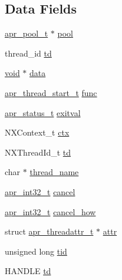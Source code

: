 \subsection*{Data Fields}
\begin{DoxyCompactItemize}
\item 
\hyperlink{structapr__pool__t}{apr\+\_\+pool\+\_\+t} $\ast$ \hyperlink{structapr__thread__t_acc06612e8a6404c0d47559be4c8e918d}{pool}
\item 
thread\+\_\+id \hyperlink{structapr__thread__t_aae7a4bb7692d30e3e4899581a5e87ff0}{td}
\item 
\hyperlink{group__MOD__ISAPI_gacd6cdbf73df3d9eed42fa493d9b621a6}{void} $\ast$ \hyperlink{structapr__thread__t_ab342d8382d9c80234fa19c632230df4f}{data}
\item 
\hyperlink{group__apr__thread__proc_gaa1f88d2a6fe971ac200e466cae5f63e0}{apr\+\_\+thread\+\_\+start\+\_\+t} \hyperlink{structapr__thread__t_ae5f93ab30b3a20eebd707e9a41d9fa98}{func}
\item 
\hyperlink{group__apr__errno_gaa5105fa83cc322f09382292db8b47593}{apr\+\_\+status\+\_\+t} \hyperlink{structapr__thread__t_a9ec6098badd8bf08b1c8fc7fb3747e44}{exitval}
\item 
N\+X\+Context\+\_\+t \hyperlink{structapr__thread__t_a34de6673457138356c44fbd3dc662904}{ctx}
\item 
N\+X\+Thread\+Id\+\_\+t \hyperlink{structapr__thread__t_a1c1cf1146c92060226a73836f65cba0b}{td}
\item 
char $\ast$ \hyperlink{structapr__thread__t_ad255d124aaee44436af04501e5196520}{thread\+\_\+name}
\item 
\hyperlink{group__apr__platform_ga21ef1e35fd3ff9be386f3cb20164ff02}{apr\+\_\+int32\+\_\+t} \hyperlink{structapr__thread__t_a77d772ca0c18485107e7a5c2b778c30f}{cancel}
\item 
\hyperlink{group__apr__platform_ga21ef1e35fd3ff9be386f3cb20164ff02}{apr\+\_\+int32\+\_\+t} \hyperlink{structapr__thread__t_a6244b09e234f465572d41e7c456f90fe}{cancel\+\_\+how}
\item 
struct \hyperlink{structapr__threadattr__t}{apr\+\_\+threadattr\+\_\+t} $\ast$ \hyperlink{structapr__thread__t_ab941acbf2b6ded301d0a1d5dbc311870}{attr}
\item 
unsigned long \hyperlink{structapr__thread__t_aa5d9bab844e08c0cc551f31492b3ab97}{tid}
\item 
H\+A\+N\+D\+LE \hyperlink{structapr__thread__t_aff27fa2be92f95db931c00d371ad5773}{td}
\end{DoxyCompactItemize}


